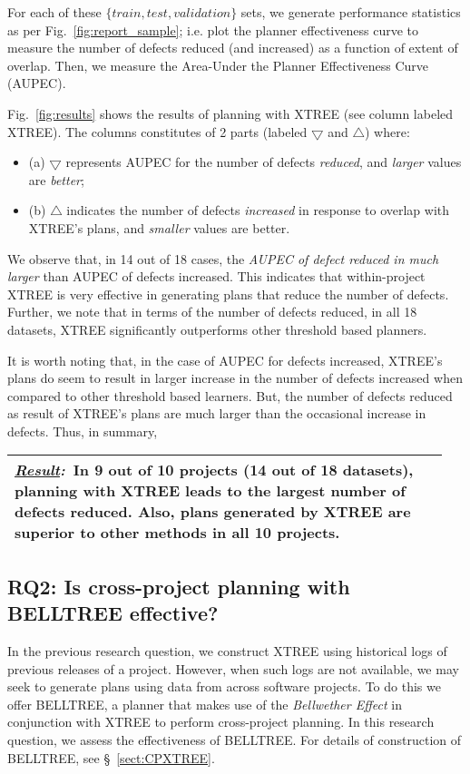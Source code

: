 \documentclass[10pt, journal, compsoc]{IEEEtran}
\newcommand{\result}[1]{
\vspace{0.2cm}
\noindent\begin{minipage}{\linewidth}
\begin{tabular}{|p{0.95\linewidth}|}
\hline\vspace{-0.2cm}
\textbf{\textit{\underline{Result}:}}~#1\\\hline
\end{tabular}
\end{minipage}\bigstrut
}
\newcommand{\tion}[1]{\S~\ref{sect:#1}}
\newcommand{\fig}[1]{Fig.~\ref{fig:#1}}
\begin{document}
For each of these $\{train, test, validation\}$ sets, we generate performance statistics as per \fig{report_sample}; i.e. plot the planner effectiveness curve to measure the number of defects reduced (and increased) as a function of extent of overlap. Then, we measure the Area-Under the Planner Effectiveness Curve (AUPEC).

\fig{results}\protect{} shows the results of planning with XTREE (see column labeled XTREE). The columns constitutes of 2 parts (labeled $\bigtriangledown$ and $\bigtriangleup$) where: 
\begin{itemize}[leftmargin=-1pt]
  \item[] (a) $\bigtriangledown$ represents AUPEC for the number of defects \textit{reduced}, and \textit{larger} values are \textit{better};
  \item[] (b) $\bigtriangleup$ indicates the number of defects \textit{increased} in response to overlap with XTREE's plans, and \textit{smaller} values are better. 
\end{itemize}

We observe that,  in 14 out of 18 cases, the \textit{AUPEC of defect reduced in much larger} than AUPEC of defects increased. This indicates that within-project XTREE is very effective in generating plans that reduce the number of defects. Further, we note that in terms of the number of defects reduced, in all 18 datasets, XTREE significantly outperforms other threshold based planners.

It is worth noting that, in the case of AUPEC for defects increased, XTREE's plans do seem to result in larger increase in the number of defects increased when compared to other threshold based learners. But, the number of defects reduced as result of XTREE's plans are much larger than the occasional increase in defects. Thus, in summary, 

\result{In 9 out of 10 projects (14 out of 18 datasets), planning with XTREE leads to the largest number of defects reduced. Also, plans generated by XTREE are superior to other methods in all 10 projects.}



\subsection*{{\bf RQ2: Is cross-project planning with BELLTREE effective?}}

In the previous research question, we construct XTREE using historical logs of previous releases of a project. However, when such logs are not available, we may seek to generate plans using data from across software projects. To do this we offer BELLTREE, a planner that makes use of the \textit{Bellwether Effect} in conjunction with XTREE to perform cross-project planning. In this research question, we assess the effectiveness of BELLTREE. For details of construction of BELLTREE, see \tion{CPXTREE}.
\end{document}
